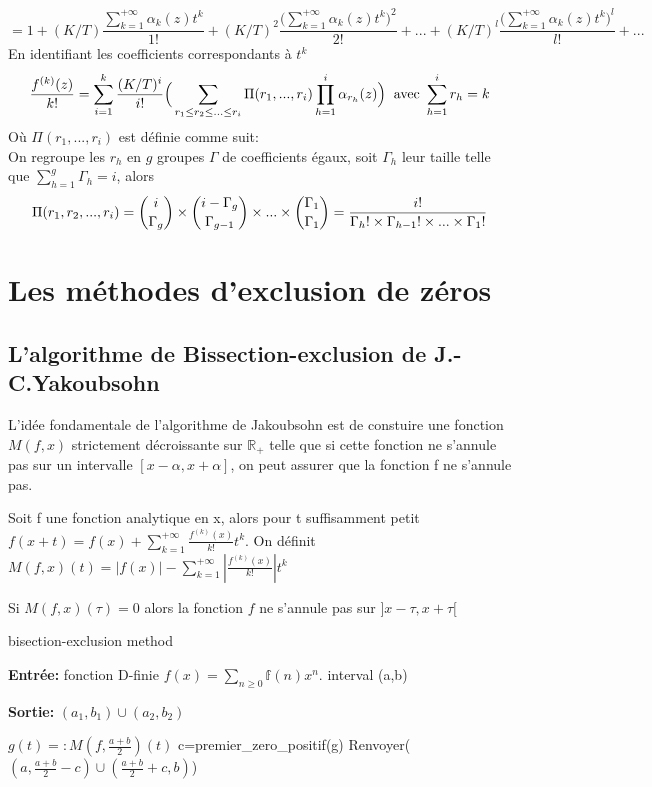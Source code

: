 \documentclass[a4paper,10.5pt]{article}
\begin{document}
	\[= 1+(K/T)\frac{\sum_{k=1}^{+\infty}\alpha_{k}(z)t^{k}}{1!}+(K/T)^{2}\frac{\big(\sum_{k=1}^{+\infty}\alpha_{k}(z)t^{k}\big)^{2}}{2!}+...+(K/T)^{l}\frac{\big(\sum_{k=1}^{+\infty}\alpha_{k}(z)t^{k}\big)^{l}}{l!}+...\]
	En identifiant les coefficients correspondants à $t^{k}$
	\[\frac{f^{(k)}(z)}{k!}=\sum_{i=1}^{k}\frac{(K/T)^{i}}{i!}\Big(\sum_{r_{1}\leq r_{2}\leq ...\leq{r_{i}}}\Pi(r_{1},...,r_{i})\prod_{h=1}^{i}\alpha_{r_{h}}(z) \Big) \hspace{2mm} \text{avec }\sum_{h=1}^{i} r_{h}=k\]
	Où $\Pi(r_{1},...,r_{i})$ est définie comme suit:\\
	On regroupe les $r_{h}$ en $g$ groupes $\Gamma$ de coefficients égaux, soit $\Gamma_{h}$ leur taille telle que $\sum_{h=1}^{g}\Gamma_{h}=i$, alors
	\[\Pi(r_{1},r_{2},...,r_{i})=\dbinom{i}{\Gamma_{g}}\times \dbinom{i-\Gamma_{g}}{\Gamma_{g-1}}\times ...\times \dbinom{\Gamma_{1}}{\Gamma_{1}}=\frac{i!}{\Gamma_h! \times \Gamma_{h-1}! \times ... \times \Gamma_1!}\]
	
	
	
	\section{Les méthodes d'exclusion de zéros}
	\subsection{L'algorithme de Bissection-exclusion de J.-C.Yakoubsohn}
	L'idée fondamentale de l'algorithme de Jakoubsohn est de constuire une fonction $M(f,x)$ strictement décroissante sur $\mathbb{R}_+$ telle que si cette fonction ne s'annule pas sur un intervalle $[x-\alpha,x+\alpha]$, on peut assurer que la fonction f ne s'annule pas.
	
	\begin{definition}Soit f une fonction analytique en x, alors pour t suffisamment petit\\ $f(x+t)=f(x)+\sum_{k=1}^{+\infty} \frac{f^{(k)}(x)}{k!}t^{k}$. On définit $M(f,x)(t)=|f(x)|-\sum_{k=1}^{+\infty}|\frac{f^{(k)}(x)}{k!}|t^{k}$
	\end{definition}
	
	\begin{proposition} Si $M(f,x)(\tau)=0$ alors la fonction $f$ ne s'annule pas sur $]x-\tau,x+\tau[$ 
	\end{proposition}

	\begin{algorithm}
		\caption{bisection-exclusion method}
		
		\vspace{2mm}
		
		\textbf{Entrée:} fonction D-finie $f(x)=\sum_{n \geq 0} \mathbb{f}(n)x^{n}$. interval (a,b)
		
		\textbf{Sortie:} $(a_{1},b_{1})\cup (a_{2},b_{2})$
		
		\begin{algorithmic}[1]
			
			\STATE $g(t)=:M(f,\frac{a+b}{2})(t)$
			\STATE c=premier\_zero\_positif(g)
			\STATE Renvoyer($(a,\frac{a+b}{2}-c)\cup (\frac{a+b}{2}+c,b)$)
		\end{algorithmic}
		
	\end{algorithm}
	
\end{document}
